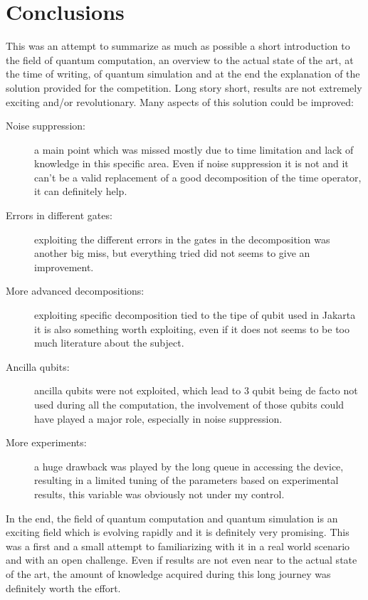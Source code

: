 \chapter{Conclusions}

This was an attempt to summarize as much as possible a short introduction to the field of quantum computation, an overview to the actual state of the art, at the time of writing, of quantum simulation and at the end the explanation of the solution provided for the competition.
Long story short, results are not extremely exciting and/or revolutionary. Many aspects of this solution could be improved:

\begin{description}
\item[Noise suppression: ]a main point which was missed mostly due to time limitation and lack of knowledge in this specific area. Even if noise suppression it is not and it can't be a valid replacement of a good decomposition of the time operator, it can definitely help.
\item[Errors in different gates: ] exploiting the different errors in the gates in the decomposition was another big miss, but everything tried did not seems to give an improvement.
\item[More advanced decompositions: ] exploiting specific decomposition tied to the tipe of qubit used in Jakarta it is also something worth exploiting, even if it does not seems to be too much literature about the subject.
\item[Ancilla qubits: ] ancilla qubits were not exploited, which lead to 3 qubit being de facto not used during all the computation, the involvement of those qubits could have played a major role, especially in noise suppression.
\item[More experiments: ] a huge drawback was played by the long queue in accessing the device, resulting in a limited tuning of the parameters based on experimental results, this variable was obviously not under my control.
\end{description}

In the end, the field of quantum computation and quantum simulation is an exciting field which is evolving rapidly and it is definitely very promising. This was a first and a small attempt to familiarizing with it in a real world scenario and with an open challenge. Even if results are not even near to the actual state of the art, the amount of knowledge acquired during this long journey was definitely worth the effort. 

